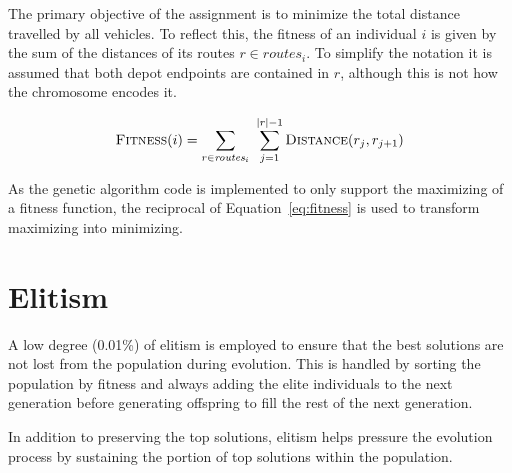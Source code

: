 \documentclass[paper=a4, fontsize=10pt]{scrartcl}
\begin{document}
\begin{multicols}{2}
The primary objective of the assignment is to minimize the total distance travelled by all vehicles. To reflect this, the fitness of an individual $i$ is given by the sum of the distances of its routes $r \in \textit{routes}_i$. To simplify the notation it is assumed that both depot endpoints are contained in $r$, although this is not how the chromosome encodes it.

\begin{equation}
\textsc{Fitness}(i) = \sum_{r \in \textit{routes}_i}~\sum_{j=1}^{\vert{} r \vert{} - 1} \textsc{Distance}(r_j, r_{j+1})
\label{eq:fitness}
\end{equation}

As the genetic algorithm code is implemented to only support the maximizing of a fitness function, the reciprocal of Equation~\ref{eq:fitness} is used to transform maximizing into minimizing.

\section*{Elitism}

A low degree (0.01\%) of elitism is employed to ensure that the best solutions are not lost from the population during evolution. This is handled by sorting the population by fitness and always adding the elite individuals to the next generation before generating offspring to fill the rest of the next generation.

In addition to preserving the top solutions, elitism helps pressure the evolution process by sustaining the portion of top solutions within the population.


\end{multicols}
\end{document}
